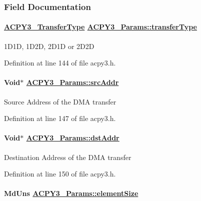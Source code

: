 \subsubsection{Field Documentation}
\hypertarget{struct_a_c_p_y3___params_6c3d7890c527cbdaaf381bde2850c01c}{
\paragraph[transferType]{\setlength{\rightskip}{0pt plus 5cm}\hyperlink{group___d_s_p_a_c_p_y3_gbe2d02fcbde983c823b138f20667cbfc}{ACPY3\_\-Transfer\-Type} \hyperlink{struct_a_c_p_y3___params_6c3d7890c527cbdaaf381bde2850c01c}{ACPY3\_\-Params::transfer\-Type}}\hfill}
\label{struct_a_c_p_y3___params_6c3d7890c527cbdaaf381bde2850c01c}


1D1D, 1D2D, 2D1D or 2D2D 

Definition at line 144 of file acpy3.h.\hypertarget{struct_a_c_p_y3___params_856068e9bcada2a38df9704fac8cdcce}{
\paragraph[srcAddr]{\setlength{\rightskip}{0pt plus 5cm}Void$\ast$ \hyperlink{struct_a_c_p_y3___params_856068e9bcada2a38df9704fac8cdcce}{ACPY3\_\-Params::src\-Addr}}\hfill}
\label{struct_a_c_p_y3___params_856068e9bcada2a38df9704fac8cdcce}


Source Address of the DMA transfer 

Definition at line 147 of file acpy3.h.\hypertarget{struct_a_c_p_y3___params_5af0ce6af53e9072085a2e7d358469af}{
\paragraph[dstAddr]{\setlength{\rightskip}{0pt plus 5cm}Void$\ast$ \hyperlink{struct_a_c_p_y3___params_5af0ce6af53e9072085a2e7d358469af}{ACPY3\_\-Params::dst\-Addr}}\hfill}
\label{struct_a_c_p_y3___params_5af0ce6af53e9072085a2e7d358469af}


Destination Address of the DMA transfer 

Definition at line 150 of file acpy3.h.\hypertarget{struct_a_c_p_y3___params_4bccffd6c879b24cdf4199ca6d4cb96e}{
\paragraph[elementSize]{\setlength{\rightskip}{0pt plus 5cm}Md\-Uns \hyperlink{struct_a_c_p_y3___params_4bccffd6c879b24cdf4199ca6d4cb96e}{ACPY3\_\-Params::element\-Size}}\hfill}
\label{struct_a_c_p_y3___params_4bccffd6c879b24cdf4199ca6d4cb96e}


